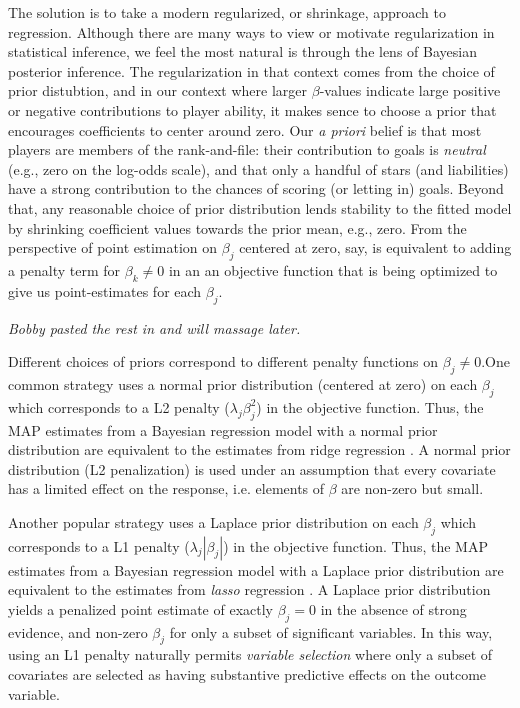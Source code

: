 The solution is to take a modern regularized, or shrinkage, approach to
regression.  Although there are many ways to view or motivate regularization
in statistical inference, we feel the most natural is through the lens of
Bayesian posterior inference.  The regularization in that context comes
from the choice of prior distubtion, and in our context where larger 
$\beta$-values indicate large positive or negative contributions to 
player ability, it makes sence to choose a prior that encourages
coefficients to center around zero.  Our {\em a priori} belief is that
most players are members of the rank-and-file: their contribution to
goals is {\em neutral} (e.g., zero on the log-odds scale), and that only
a handful of stars (and liabilities) have a strong contribution to
the chances of scoring (or letting in) goals.  Beyond that, any reasonable
choice of prior distribution lends stability to the fitted model by
shrinking coefficient values towards the prior mean, e.g., zero.  From 
the perspective of point estimation on $\beta_j$ centered at zero, say,
is equivalent to adding a penalty term for $\beta_k \ne 0$ in an
an objective function that is being optimized to give us point-estimates
for each $\beta_j$.  


{\em Bobby pasted the rest in and will massage later.}

Different choices of priors correspond to different penalty functions on
$\beta_j \ne 0$.One common strategy uses a normal
prior distribution (centered at zero) on each $\beta_j$ which
corresponds to a L2 penalty ($\lambda_j \beta_j^2$) in the objective
function.  Thus, the MAP estimates from a Bayesian regression model
with a normal prior distribution are equivalent to the estimates from
ridge regression \cite{HoeKen70}.  A normal prior distribution (L2
penalization) is used under an assumption that every covariate has a
limited effect on the response, i.e. elements of $\beta$ are
non-zero but small.

Another popular strategy uses a Laplace prior distribution on each
$\beta_j$ which corresponds to a L1 penalty ($\lambda_j |\beta_j|$) in
the objective function.  Thus, the MAP estimates from a Bayesian
regression model with a Laplace prior distribution are equivalent to
the estimates from {\it lasso} regression \cite{Tib96}.  A Laplace
prior distribution yields a penalized point estimate of exactly
$\beta_j=0$ in the absence of strong evidence, and non-zero $\beta_j$
for only a subset of significant variables.  In this way, using an L1
penalty naturally permits {\it variable selection} where only a subset
of covariates are selected as having substantive predictive effects on
the outcome variable.
  
